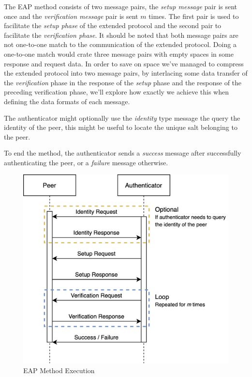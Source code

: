 The EAP method consists of two message pairs, the \textit{setup message} pair is sent once and the \textit{verification message} pair is sent $m$ times.
The first pair is used to facilitate the \textit{setup phase} of the extended protocol and the second pair to facilitate the \textit{verification phase}.
It should be noted that both message pairs are not one-to-one match to the communication of the extended protocol. Doing a one-to-one match would crate three message pairs with empty spaces in some response and request data.
In order to save on space we've managed to compress the extended protocol into two message pairs, by interlacing some data transfer of the \textit{verification} phase in the response of the \textit{setup} phase and the response of the preceding verification phase, we'll explore how exactly we achieve this when defining the data formats of each message.

The authenticator might optionally use the \textit{identity} type message the query the identity of the peer, this might be useful to locate the unique salt belonging to the peer.

To end the method, the authenticator sends a \textit{success} message after successfully authenticating the peer, or a \textit{failure} message otherwise.

\begin{figure}[h]
	\centering
	\includegraphics[width=12cm]{images/EAP_Method.png}
	\caption{EAP Method Execution}
	\label{fig:eap-method-protocol}
\end{figure}

